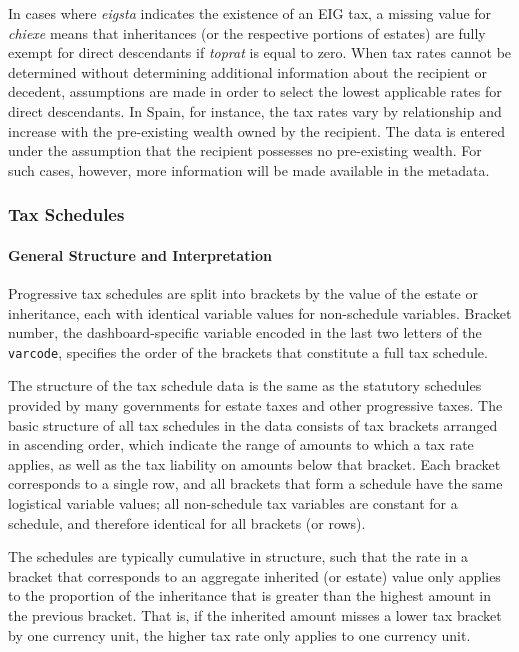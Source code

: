 \documentclass[
]{article}
\begin{document}
In cases where \emph{eigsta} indicates the existence of an EIG tax, a
missing value for \emph{chiexe} means that inheritances (or the
respective portions of estates) are fully exempt for direct descendants
if \emph{toprat} is equal to zero. When tax rates cannot be determined
without determining additional information about the recipient or
decedent, assumptions are made in order to select the lowest applicable
rates for direct descendants. In Spain, for instance, the tax rates vary
by relationship and increase with the pre-existing wealth owned by the
recipient. The data is entered under the assumption that the recipient
possesses no pre-existing wealth. For such cases, however, more
information will be made available in the metadata.

\subsubsection{Tax Schedules}\label{subsec:sched}

\paragraph{General Structure and
Interpretation}\label{general-structure-and-interpretation}

Progressive tax schedules are split into brackets by the value of the
estate or inheritance, each with identical variable values for
non-schedule variables. Bracket number, the dashboard-specific variable
encoded in the last two letters of the \texttt{varcode}, specifies the
order of the brackets that constitute a full tax schedule.

The structure of the tax schedule data is the same as the statutory
schedules provided by many governments for estate taxes and other
progressive taxes. The basic structure of all tax schedules in the data
consists of tax brackets arranged in ascending order, which indicate the
range of amounts to which a tax rate applies, as well as the tax
liability on amounts below that bracket. Each bracket corresponds to a
single row, and all brackets that form a schedule have the same
logistical variable values; all non-schedule tax variables are constant
for a schedule, and therefore identical for all brackets (or rows).

The schedules are typically cumulative in structure, such that the rate
in a bracket that corresponds to an aggregate inherited (or estate)
value only applies to the proportion of the inheritance that is greater
than the highest amount in the previous bracket. That is, if the
inherited amount misses a lower tax bracket by one currency unit, the
higher tax rate only applies to one currency unit.
\end{document}
